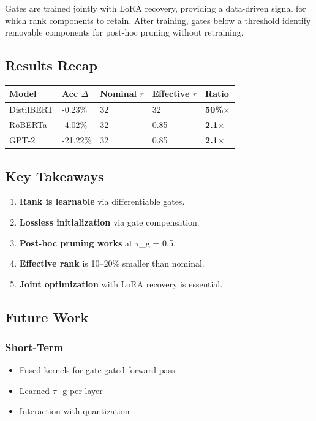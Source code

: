 Gates are trained jointly with LoRA recovery, providing a data-driven 
signal for which rank components to retain. After training, gates below 
a threshold identify removable components for post-hoc pruning without 
retraining.

\subsection{Results Recap}

\begin{table}[H]
\centering
\small
\begin{tabular}{lllll}
\toprule
\textbf{Model} & \textbf{Acc $\Delta$} & \textbf{Nominal $r$} & \textbf{Effective $r$} & \textbf{Ratio} \\
\midrule
DistilBERT & -0.23\% & 32 & 32 & \textbf{50\%$\times$} \\
RoBERTa & -4.02\% & 32 & 0.85 & \textbf{2.1$\times$} \\
GPT-2 & -21.22\% & 32 & 0.85 & \textbf{2.1$\times$} \\
\bottomrule
\end{tabular}
\end{table}

\subsection{Key Takeaways}

\begin{enumerate}
\item \textbf{Rank is learnable} via differentiable gates.
\item \textbf{Lossless initialization} via gate compensation.
\item \textbf{Post-hoc pruning works} at $\tau$\_g = 0.5.
\item \textbf{Effective rank} is 10--20\% smaller than nominal.
\item \textbf{Joint optimization} with LoRA recovery is essential.

\end{enumerate}
\subsection{Future Work}

\subsubsection{Short-Term}
\begin{itemize}
\item Fused kernels for gate-gated forward pass
\item Learned $\tau$\_g per layer
\item Interaction with quantization

\end{itemize}
